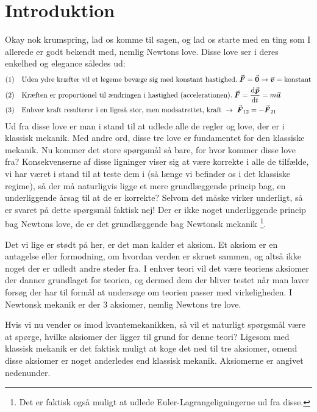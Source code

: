 \documentclass[../Kvantemekanik.tex]{subfiles}
\begin{document}
\section{Introduktion}
Okay nok krumspring, lad os komme til sagen, og lad os starte med en ting som I allerede er godt bekendt med, nemlig Newtons love. Disse love ser i deres enkelhed og elegance således ud:
\begin{align*}
    (1)\quad & \text{Uden ydre kræfter vil et legeme bevæge sig med konstant hastighed.} \; \v F=\v 0 \rightarrow \v v=\text{konstant}\\
    (2)\quad & \text{Kræften er proportionel til ændringen i hastighed (accelerationen).}\; \v F=\dif{t}{\v p}=m \v a\\
    (3)\quad & \text{Enhver kraft resulterer i en ligeså stor, men modsatrettet, kraft}\; \rightarrow \; \v F_{12}=-\v F_{21}
\end{align*}
Ud fra disse love er man i stand til at udlede alle de regler og love, der er i klassisk mekanik. Med andre ord, disse tre love er fundamentet for den klassiske mekanik. Nu kommer det store spørgsmål så bare, for hvor kommer disse love fra?
Konsekvenserne af disse ligninger viser sig at være korrekte i alle de tilfælde, vi har været i stand til at teste dem i (så længe vi befinder os i det klassiske regime), så der må naturligvis ligge et mere grundlæggende princip bag, en underliggende årsag til at de er korrekte? Selvom det måske virker underligt, så er svaret på dette spørgsmål faktisk nej! Der er ikke noget underliggende princip bag Newtons love, de er det grundlæggende bag Newtonsk mekanik \footnote{Det er faktisk også muligt at udlede Euler-Lagrangeligningerne ud fra disse.}.

Det vi lige er stødt på her, er det man kalder et aksiom. Et aksiom er en antagelse eller formodning, om hvordan verden er skruet sammen, og altså ikke noget der er udledt andre steder fra. I enhver teori vil det være teoriens aksiomer der danner grundlaget for teorien, og dermed dem der bliver testet når man laver forsøg der har til formål at undersøge om teorien passer med virkeligheden. I Newtonsk mekanik er der 3 aksiomer, nemlig Newtons tre love.

Hvis vi nu vender os imod kvantemekanikken, så vil et naturligt spørgsmål være at spørge, hvilke aksiomer der ligger til grund for denne teori? Ligesom med klassisk mekanik er det faktisk muligt at koge det ned til tre aksiomer, omend disse aksiomer er noget anderledes end klassisk mekanik. Aksiomerne er angivet nedenunder.
\end{document}
